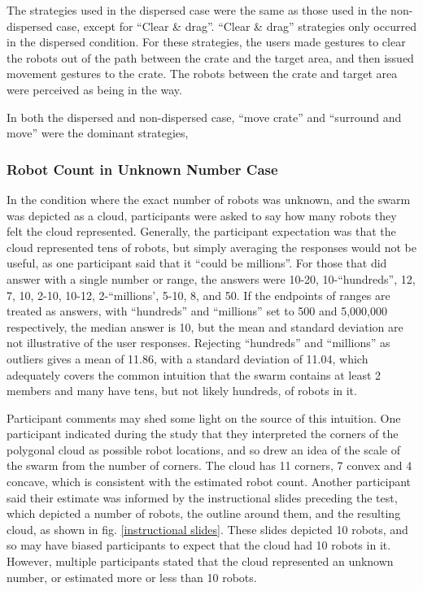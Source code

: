 The strategies used in the dispersed case were the same as those used in the non-dispersed case, except for ``Clear \& drag''.
``Clear \& drag'' strategies only occurred in the dispersed condition. 
For these strategies, the users made gestures to clear the robots out of the path between the crate and the target area, and then issued movement gestures to the crate. 
The robots between the crate and target area were perceived as being in the way. 
 
In both the dispersed and non-dispersed case, ``move crate'' and ``surround and move'' were the dominant strategies, 

%


\subsubsection{Robot Count in Unknown Number Case} \label{section:Robot_Count_in_Unknown_Number_Case}

In the condition where the exact number of robots was unknown, and the swarm was depicted as a cloud, participants were asked to say how many robots they felt the cloud represented. 
Generally, the participant expectation was that the cloud represented tens of robots, but simply averaging the responses would not be useful, as one participant said that it ``could be millions''. 
For those that did answer with a single number or range, the answers were 10-20, 10-``hundreds'', 12, 7, 10, 2-10, 10-12, 2-``millions', 5-10, 8, and 50. 
If the endpoints of ranges are treated as answers, with ``hundreds'' and ``millions'' set to 500 and 5,000,000 respectively, the median answer is 10, but the mean and standard deviation are not illustrative of the user responses. 
Rejecting ``hundreds'' and ``millions'' as outliers gives a mean of 11.86, with a standard deviation of 11.04, which adequately covers the common intuition that the swarm contains at least 2 members and many have tens, but not likely hundreds, of robots in it.

Participant comments may shed some light on the source of this intuition. 
One participant indicated during the study that they interpreted the corners of the polygonal cloud as possible robot locations, and so drew an idea of the scale of the swarm from the number of corners. 
The cloud has 11 corners, 7 convex and 4 concave, which is consistent with the estimated robot count. 
Another participant said their estimate was informed by the instructional slides preceding the test, which depicted a number of robots, the outline around them, and the resulting cloud, as shown in fig. \ref{instructional slides}. 
These slides depicted 10 robots, and so may have biased participants to expect that the cloud had 10 robots in it. 
However, multiple participants stated that the cloud represented an unknown number, or estimated more or less than 10 robots.

